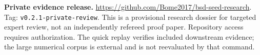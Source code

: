\documentclass[11pt]{amsart}
\theoremstyle{plain}
\theoremstyle{definition}
\theoremstyle{remark}
\begin{document}
\maketitle
\noindent\textbf{Private evidence release.}
\url{https://github.com/Bome2017/bsd-seed-research}.
Tag: \texttt{v0.2.1-private-review}.
This is a provisional research dossier for targeted expert review, not an independently refereed proof paper. Repository access requires authorization. The quick replay verifies included downstream evidence; the large numerical corpus is external and is not reevaluated by that command.


\tableofcontents












\appendix









\end{document}
